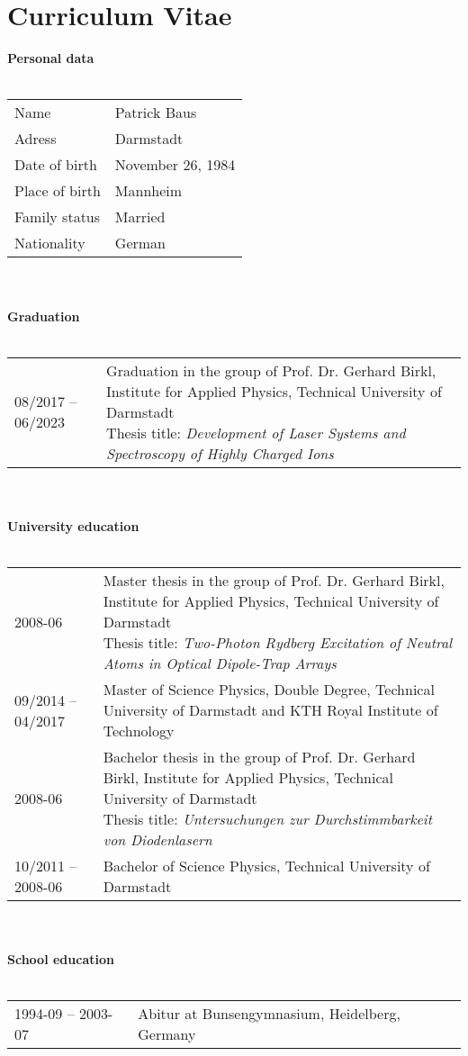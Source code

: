 \documentclass[12pt]{book}
\begin{document}
\chapter*{Curriculum Vitae}
\begingroup
\renewcommand{\arraystretch}{1.5}
{\Large \textbf{Personal data}}\\
\\%
\noindent%
\begin{tabular}{@{}ll}
Name & Patrick Baus \\
Adress & Darmstadt \\
Date of birth & November 26, 1984 \\
Place of birth & Mannheim \\
Family status & Married \\
Nationality & German
\end{tabular}\\
\vspace{1cm}\\%
\noindent%
{\Large \textbf{Graduation}}\\
\\%
\noindent%
\begin{tabular}{@{}ll}
08/2017 -- 06/2023 & \parbox[t]{11cm}{Graduation in the group of Prof. Dr. Gerhard Birkl, Institute for Applied Physics, Technical University of Darmstadt \\
Thesis title: \textit{Development of Laser Systems and Spectroscopy of Highly Charged Ions} }
\end{tabular}\\
\vspace{1cm}\\%
\noindent%
{\Large \textbf{University education}}\\
\\%
\noindent%
\begin{tabular}{@{}ll}
    2008-06 & \parbox[t]{11cm}{Master thesis in the group of Prof. Dr. Gerhard Birkl, Institute for Applied Physics, Technical University of Darmstadt \\
    Thesis title: \textit{Two-Photon Rydberg Excitation of Neutral Atoms in Optical Dipole-Trap Arrays} }\\
    09/2014 -- 04/2017 & \parbox[t]{11cm}{Master of Science Physics, Double Degree, Technical University of Darmstadt and KTH Royal Institute of Technology}\\
    2008-06 & \parbox[t]{11cm}{Bachelor thesis in the group of Prof. Dr. Gerhard Birkl, Institute for Applied Physics, Technical University of Darmstadt \\
    Thesis title: \textit{Untersuchungen zur Durchstimmbarkeit von Diodenlasern}} \\
    10/2011 -- 2008-06 & \parbox[t]{11cm}{Bachelor of Science Physics, Technical University of Darmstadt}
\end{tabular}\\
\vspace{1cm}\\%
\noindent%
{\Large \textbf{School education}}\\
\\%
\noindent%
\begin{tabular}{@{}ll}
1994-09 -- 2003-07 & Abitur at Bunsengymnasium, Heidelberg, Germany
\end{tabular}
\endgroup
\end{document}
